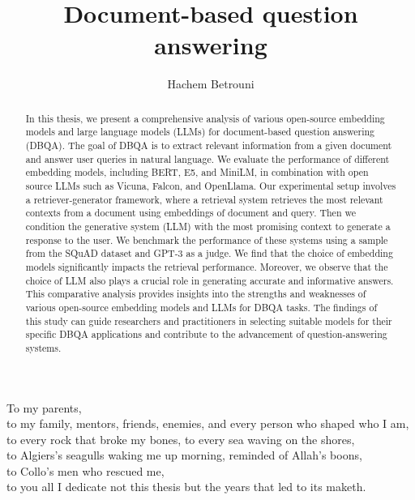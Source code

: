 \documentclass[a4paper,12pt]{article}
\author[1,2]{Hachem Betrouni}
\affil[1]{National Polytechnic school of Algiers, Industrial Engineering Department, Data Science and AI, Algiers, hachem.betrouni@g.enp.edu.dz}
\affil[2]{BIGmama technology, France, hb@big-mama.io}
\title{Document-based question answering}
\begin{document}
\maketitle
\begin{abstract}
	In this thesis, we present a comprehensive analysis of various open-source embedding models and large language models (LLMs) for document-based question answering (DBQA). The goal of DBQA is to extract relevant information from a given document and answer user queries in natural language. We evaluate the performance of different embedding models, including BERT, E5, and MiniLM, in combination with open source LLMs such as Vicuna, Falcon, and OpenLlama.
	Our experimental setup involves a retriever-generator framework, where a retrieval system retrieves the most relevant contexts from a document using embeddings of document and query. Then we condition the generative system (LLM) with the most promising context to generate a response to the user. 
	We benchmark the performance of these systems using a sample from the SQuAD dataset and GPT-3 as a judge.
	We find that the choice of embedding models significantly impacts the retrieval performance. Moreover, we observe that the choice of LLM also plays a crucial role in generating accurate and informative answers.
	This comparative analysis provides insights into the strengths and weaknesses of various open-source embedding models and LLMs for DBQA tasks. 
	The findings of this study can guide researchers and practitioners in selecting suitable models for their specific DBQA applications and contribute to the advancement of question-answering systems.
\end{abstract}

\clearpage
\begin{center}
	\thispagestyle{empty}
	\vspace*{\fill}
	To my parents,\\
	to my family, mentors, friends, enemies, and every person who shaped who I am, \\
	to every rock that broke my bones, to every sea waving on the shores, \\  
	to Algiers's seagulls waking me up morning, reminded of Allah's boons,\\
	to Collo's men who rescued me,\\
	to you all I dedicate not this thesis but the years that led to its maketh.\\
	\vspace*{\fill}
\end{center}
\clearpage
\end{document}
